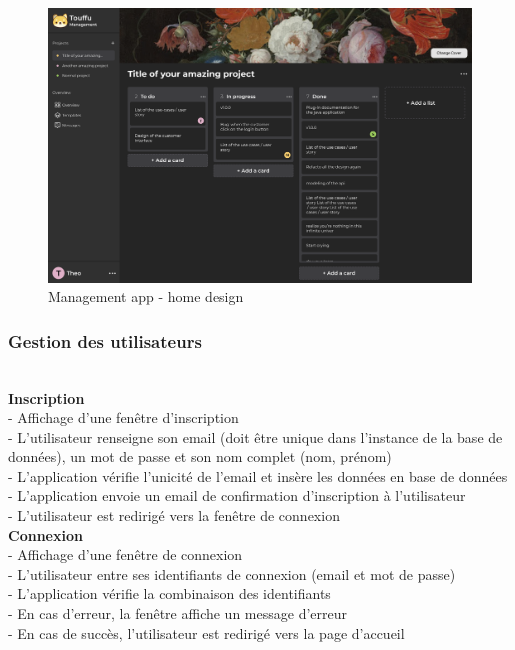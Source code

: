 \documentclass[conference]{IEEEtran}
\begin{document}
\begin{figure}[h]
	\centering
	\includegraphics[width=\columnwidth]{Ressources/Images/Touffu-management-home}
	\caption{Management app - home design}
	\label{fig:touffumanagementhomedesign}
\end{figure}

\subsubsection{Gestion des utilisateurs}\hfil\\

\textbf{Inscription}\\
- Affichage d'une fenêtre d'inscription\\
- L'utilisateur renseigne son email (doit être unique dans l'instance de la base de données), un mot de passe et son nom complet (nom, prénom)\\
- L'application vérifie l'unicité de l'email et insère les données en base de données\\
- L'application envoie un email de confirmation d'inscription à l'utilisateur\\
- L'utilisateur est redirigé vers la fenêtre de connexion\\

\textbf{Connexion}\\
- Affichage d'une fenêtre de connexion\\
- L'utilisateur entre ses identifiants de connexion (email et mot de passe)\\
- L'application vérifie la combinaison des identifiants\\
- En cas d'erreur, la fenêtre affiche un message d'erreur\\
- En cas de succès, l'utilisateur est redirigé vers la page d'accueil\\
\end{document}
